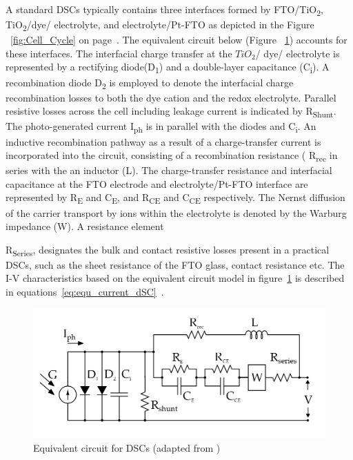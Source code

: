 A standard \ac{DSCs} typically contains three interfaces formed by FTO/TiO\textsubscript{2}, TiO\textsubscript{2}/dye/ electrolyte, and electrolyte/Pt-FTO as depicted in the Figure ~\ref{fig:Cell_Cycle} on page~\pageref{fig:Cell_Cycle}. The equivalent circuit below (Figure ~\ref{fig:dsc_eq_ckt}) accounts for these interfaces. The interfacial charge transfer at the $TiO_{2}$/ dye/ electrolyte is represented by a rectifying diode(D\textsubscript{1}) and a double-layer capacitance (C\textsubscript{i}). A recombination diode D\textsubscript{2} is employed to denote the interfacial charge recombination losses to both the dye cation and the redox electrolyte. Parallel resistive losses across the cell including leakage current is indicated by R\textsubscript{Shunt}. The photo-generated current I\textsubscript{ph} is in parallel with the diodes and C\textsubscript{i}. An inductive recombination pathway as a result of a charge-transfer current is incorporated into the circuit, consisting of a recombination resistance ( R\textsubscript{rec} in series with the an inductor (L). The charge-transfer resistance and interfacial capacitance at the FTO electrode and electrolyte/Pt-FTO interface are represented by R\textsubscript{E} and C\textsubscript{E}, and R\textsubscript{CE} and C\textsubscript{CE} respectively. The Nernst diffusion of the carrier transport by ions within the electrolyte is denoted by the Warburg impedance (W). A resistance element {R\textsubscript{Series}, designates the bulk and contact resistive losses present in a practical \ac{DSCs}, such as the sheet resistance of the FTO glass, contact resistance etc. The I-V characteristics based on the equivalent circuit model in figure~\ref{fig:dsc_eq_ckt} is described in equations~\ref{eq:equ_current_dSC}~\cite{yong2008modeling}.
    


 \begin{figure}[H]
  \begin{center}
	\includegraphics[width=1.0\linewidth]{images/dsc_eq_ckt}
	\caption{Equivalent circuit for DSCs (adapted from \cite{yong2008modeling})  }
	\label{fig:dsc_eq_ckt}
  \end{center}
  \end{figure}

}

